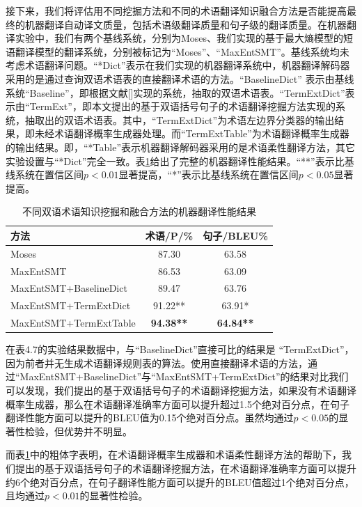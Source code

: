 接下来，我们将评估用不同挖掘方法和不同的术语翻译知识融合方法是否能提高最终的机器翻译自动译文质量，包括术语级翻译质量和句子级的翻译质量。在机器翻译实验中，我们有两个基线系统，分别为Moses、我们实现的基于最大熵模型的短语翻译模型的翻译系统，分别被标记为“Moses”、“MaxEntSMT”。基线系统均未考虑术语翻译问题。“*Dict”表示在我们实现的机器翻译系统中，机器翻译解码器采用的是通过查询双语术语表的直接翻译术语的方法。“BaselineDict” 表示由基线系统“Baseline”，即根据文献[\cite{Cao:2007}]实现的系统，抽取的双语术语表。“TermExtDict”表示由“TermExt”，即本文提出的基于双语括号句子的术语翻译挖掘方法实现的系统，抽取出的双语术语表。其中，“TermExtDict”为术语左边界分类器的输出结果，即未经术语翻译概率生成器处理。而“TermExtTable”为术语翻译概率生成器的输出结果。即，“*Table”表示机器翻译解码器采用的是术语柔性翻译方法，其它实验设置与“*Dict”完全一致。表\ref{Table_term_extract_mt_result}给出了完整的机器翻译性能结果。“**”表示比基线系统在置信区间$p<0.01$显著提高，“*”表示比基线系统在置信区间$p<0.05$显著提高。

\begin{table}[!htbp]
	\centering
	\begin{tabular}{|l|c|c|}
		\hline
		方法  & 术语/P/\% & 句子/BLEU\% \\ 
		\hline
		Moses         & 87.30 & 63.58 \\ \hline
		MaxEntSMT	  & 86.53 &	63.09 \\ \hline
		MaxEntSMT+BaselineDict & 89.47 & 63.76 \\ \hline
		MaxEntSMT+TermExtDict &	91.22** &	63.91* \\ \hline
		MaxEntSMT+TermExtTable & \textbf{94.38**} &	\textbf{64.84**} \\
		\hline
	\end{tabular}
	\caption{不同双语术语知识挖掘和融合方法的机器翻译性能结果}
	\label{Table_term_extract_mt_result}
\end{table}

在表4.7的实验结果数据中，与“BaselineDict”直接可比的结果是\linebreak
“TermExtDict”，因为前者并无生成术语翻译规则表的算法。使用直接翻译术语的方法，通过“MaxEntSMT+BaselineDict”与“MaxEntSMT+TermExtDict”的结果对比我们可以发现，我们提出的基于双语括号句子的术语翻译挖掘方法，如果没有术语翻译概率生成器，那么在术语翻译准确率方面可以提升超过1.5个绝对百分点，在句子翻译性能方面可以提升的BLEU值为0.15个绝对百分点。虽然均通过$p<0.05$的显著性检验，但优势并不明显。

而表\ref{Table_term_extract_mt_result}中的粗体字表明，在术语翻译概率生成器和术语柔性翻译方法的帮助下，我们提出的基于双语括号句子的术语翻译挖掘方法，在术语翻译准确率方面可以提升约6个绝对百分点，在句子翻译性能方面可以提升的BLEU值超过1个绝对百分点，且均通过$p<0.01$的显著性检验。

